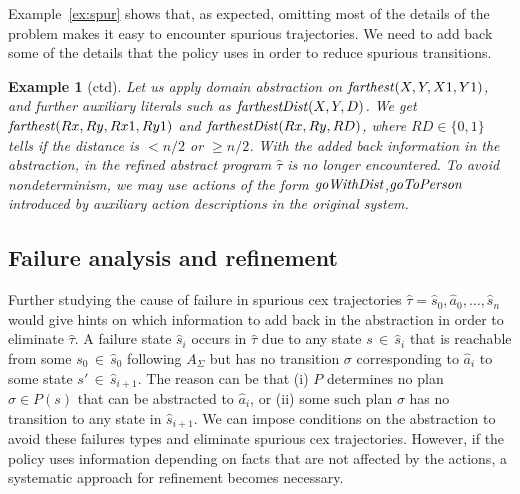 \documentclass{new_tlp}
\newcommand{\sys}{\ensuremath{A}}
\def\mi#1{\mathit{#1\/}}
\newtheorem{exmp}{Example}
\begin{document}
Example~\ref{ex:spur} shows that, as expected, omitting most of the
details of the problem makes it easy to encounter spurious
trajectories. We need to add back some of the details that the policy uses in order to reduce spurious transitions.

\begin{exmp}[ctd]
Let us apply domain abstraction on $\mi{farthest}(X,Y,X1,Y1)$, and
further auxiliary literals such as $\mi{farthestDist}(X,Y,D)$. We get
$\mi{farthest}(Rx,Ry,Rx1,Ry1)$ and $\mi{farthestDist}(Rx,Ry,RD)$,
where $RD \in \{0,1\}$ tells if the distance is $<n/2$ or $\geq
n/2$. With the added back information in the abstraction, 
in the refined abstract program $\hat{\tau}$ is
no longer encountered.
To avoid nondeterminism, %
we may use actions of the form $\mi{goWithDist}$,$\mi{goToPerson}$
introduced by  auxiliary action descriptions in the original system.
\end{exmp}


\subsection{Failure analysis and refinement}

Further studying the cause of failure in spurious cex trajectories $\hat{\tau}=\hat{s}_0,\hat{a}_0,\dots,\hat{s}_n$
would give hints on which
information to add back in the
abstraction in order to eliminate $\hat{\tau}$. 
A failure state $\hat{s}_i$ occurs in
$\hat{\tau}$ 
due to any state $s\,{\in}\, \hat{s}_i$ that is reachable from some $s_0\,{\in}\, \hat{s}_0$ following
$\sys_\Sigma$ but has no transition $\sigma$
corresponding to $\hat{a}_i$ to some state $s'\,{\in}\,\hat{s}_{i+1}$. 
The reason can be that (i)
$P$ determines no plan $\sigma\in P(s)$ that can be abstracted to
$\hat{a}_i$, or (ii) some such plan $\sigma$  has no transition to any
state in $\hat{s}_{i+1}$.
%
We can impose conditions on the abstraction to avoid 
these failures types and 
eliminate spurious cex trajectories. However, 
if the policy uses
information depending on facts that are not affected by the
actions, a systematic approach for refinement becomes necessary.
\end{document}
